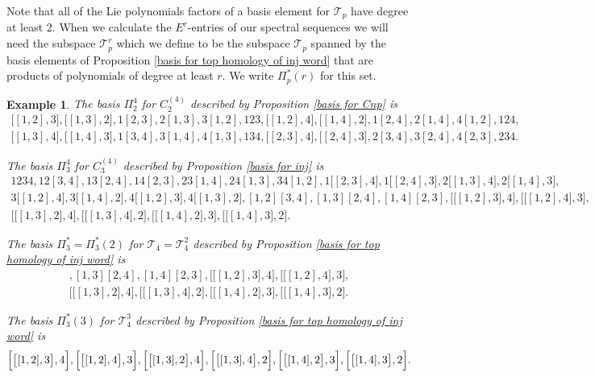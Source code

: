 \documentclass[pagebackref,colorlinks,citecolor=blue,linkcolor=blue,urlcolor=blue,filecolor=blue]{article}
\newtheorem{exam}[thm]{Example}
\theoremstyle{definition}\newtheorem{definition}[thm]{Definition}
\theoremstyle{definition}
\begin{document}
Note that all of the Lie polynomials factors of a basis element for $\mathcal{T}_{p}$ have degree at least $2$.
When we calculate the $E^{r}$-entries of our spectral sequences we will need the subspace $\mathcal{T}_{p}^{r}$ which we define to be the subspace $\mathcal{T}_{p}$ spanned by the basis elements of Proposition \ref{basis for top homology of inj word} that are products of polynomials of degree at least $r$.
We write $\Pi^{*}_{p}(r)$ for this set.

\begin{exam}

The basis $\Pi^{4}_{2}$ for $C^{(4)}_{2}$ described by Proposition \ref{basis for Cnp} is
\begin{multline*}
\big[[1,2],3\big], \big[[1,3],2\big], 1[2,3], 2[1,3], 3[1,2], 123, \big[[1,2], 4\big], \big[[1,4],2\big], 1[2,4], 2[1,4], 4[1,2], 124,\\
 \big[[1,3],4\big], \big[[1,4],3\big],1[3,4], 3[1,4], 4[1,3], 134, \big[[2,3],4\big], \big[[2,4],3\big],2[3,4], 3[2,4], 4[2,3], 234.
\end{multline*}

The basis $\Pi^{4}_{3}$ for $C^{(4)}_{3}$ described by Proposition \ref{basis for inj} is 
\begin{multline*}
1234, 12[3,4], 13[2,4], 14[2,3], 23[1,4], 24[1,3], 34[1,2], 1\big[[2,3],4\big], 1\big[[2,4],3\big], 2\big[[1,3],4\big], 2\big[[1,4],3\big], \\ 3\big[[1,2],4\big], 3\big[[1,4],2\big],
4\big[[1,2],3\big], 4\big[[1,3],2\big],  [1,2][3,4], [1,3][2,4], [1,4][2,3], \Big[\big[[1,2],3\big],4\Big], \Big[\big[[1,2],4\big],3\Big],\\\Big[\big[[1,3],2\big],4\Big],
\Big[\big[[1,3],4\big],2\Big],
\Big[\big[[1,4],2\big],3\Big],
\Big[\big[[1,4],3\big],2\Big].
\end{multline*}

The basis $\Pi^{*}_{3}=\Pi^{*}_{3}(2)$ for $\mathcal{T}_{4}=\mathcal{T}^{2}_{4}$ described by Proposition \ref{basis for top homology of inj word} is
\begin{multline*}
[1,2][3,4], [1,3][2,4], [1,4][2,3], \Big[\big[[1,2],3\big],4\Big], \Big[\big[[1,2],4\big],3\Big],\\\Big[\big[[1,3],2\big],4\Big],
\Big[\big[[1,3],4\big],2\Big],
\Big[\big[[1,4],2\big],3\Big],
\Big[\big[[1,4],3\big],2\Big].
\end{multline*}

The basis $\Pi_{3}^{*}(3)$ for $\mathcal{T}_{4}^{3}$ described by Proposition \ref{basis for top homology of inj word} is
\[
\Big[\big[[1,2],3\big],4\Big], \Big[\big[[1,2],4\big],3\Big],\\\Big[\big[[1,3],2\big],4\Big],
\Big[\big[[1,3],4\big],2\Big],
\Big[\big[[1,4],2\big],3\Big],
\Big[\big[[1,4],3\big],2\Big].
\]
\end{exam}
\end{document}
